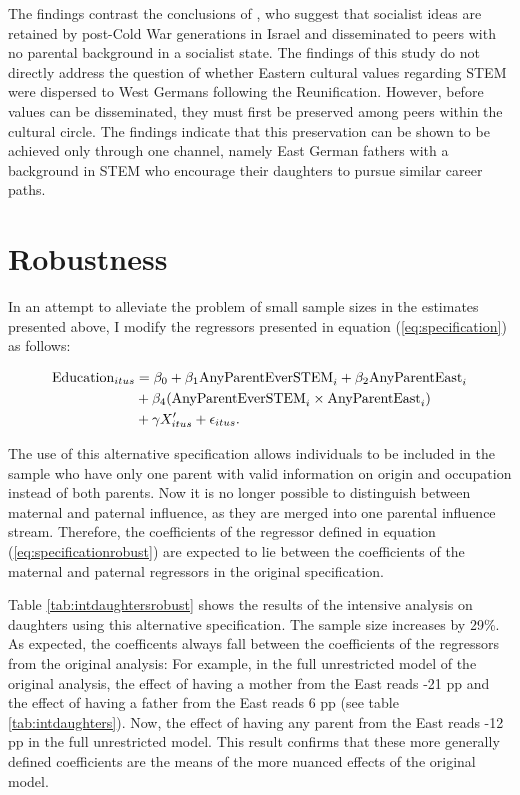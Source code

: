 \documentclass[a4paper, oneside, hyperfootnotes = false]{article}
\begin{document}
{The findings contrast the conclusions of \cite{FriedmanSokuler2020}, who suggest that socialist ideas are retained by post-Cold War generations in Israel and disseminated to peers with no parental background in a socialist state.
The findings of this study do not directly address the question of whether Eastern cultural values regarding STEM were dispersed to West Germans following the Reunification.
However, before values can be disseminated, they must first be preserved among peers within the cultural circle.
The findings indicate that this preservation can be shown to be achieved only through one channel, namely East German fathers with a background in STEM who encourage their daughters to pursue similar career paths.

\section{Robustness}
\label{robustness}

In an attempt to alleviate the problem of small sample sizes in the estimates presented above, I modify the regressors presented in equation (\ref{eq:specification}) as follows:

\vspace{-8mm}

\begin{equation}
	\begin{split}
		\label{eq:specificationrobust}
		\textnormal{Education}_{itus} &={} \beta_{0} + \beta_{1}\textnormal{AnyParentEverSTEM}_{i} + \beta_{2}\textnormal{AnyParentEast}_{i} \\
		& + \beta_{4}(\textnormal{AnyParentEverSTEM}_{i} \times \textnormal{AnyParentEast}_{i}) \\
		& + \gamma{}X'_{itus} + \epsilon_{itus}\textnormal{.}
	\end{split}
\end{equation}

\noindent The use of this alternative specification allows individuals to be included in the sample who have only one parent with valid information on origin and occupation instead of both parents.
Now it is no longer possible to distinguish between maternal and paternal influence, as they are merged into one parental influence stream.
Therefore, the coefficients of the regressor defined in equation (\ref{eq:specificationrobust}) are expected to lie between the coefficients of the maternal and paternal regressors in the original specification.

Table \ref{tab:intdaughtersrobust} shows the results of the intensive analysis on daughters using this alternative specification.
The sample size increases by 29\%.
As expected, the coefficents always fall between the coefficients of the regressors from the original analysis:
For example, in the full unrestricted model of the original analysis, the effect of having a mother from the East reads -21 pp and the effect of having a father from the East reads 6 pp (see table \ref{tab:intdaughters}).
Now, the effect of having any parent from the East reads -12 pp in the full unrestricted model.
This result confirms that these more generally defined coefficients are the means of the more nuanced effects of the original model.

}
\end{document}
